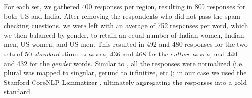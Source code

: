 \documentclass[11pt,letterpaper]{article}
\begin{document}
For each set, we gathered 400 responses per region, resulting in 800 responses for both US and India. After removing the respondents who did not pass the spam-checking questions, we were left with an average of 752 responses per word, which we then balanced by gender, to retain an equal number of Indian women, Indian men, US women, and US men.
This resulted in 492 and 480 responses for the two sets of 50 \textit{standard} stimulus words, 436 and 468 for the \textit{culture} words, and 440 and 432 for the \textit{gender} words. Similar to \cite{Rosenzweig1961}, all the responses were normalized (i.e. plural was mapped to singular, gerund to infinitive, etc.); in our case we used the Stanford CoreNLP Lemmatizer \cite{Manning14}, ultimately aggregating the responses into a gold standard. %



\end{document}
